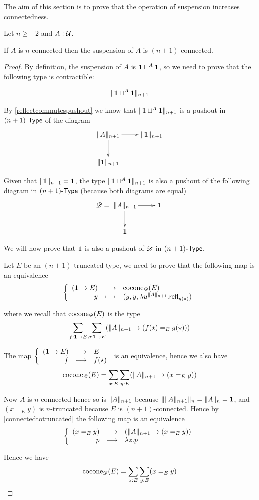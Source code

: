 The aim of this section is to prove that the operation of suspension increases
connectedness.

\begin{thm}
  Let $n\ge-2$ and $A:\type$.

  If $A$ is $n$-connected then the suspension of $A$ is $(n+1)$-connected.
\end{thm}

\begin{proof}
  By definition, the suspension of $A$ is $\unit\sqcup^A\unit$, so we need to
  prove that the following type is contractible:

  \[\trunc{n+1}{\unit\sqcup^A\unit}\]

  By \autoref{reflectcommutespushout} we know that
  $\trunc{n+1}{\unit\sqcup^A\unit}$ is a pushout in $\typelep{n+1}$ of the diagram
  \[\xymatrix{\trunc{n+1}A \ar[d] \ar[r] & \trunc{n+1}{\unit} \\
    \trunc{n+1}{\unit} & }\]

  Given that $\trunc{n+1}{\unit}=\unit$, the type
  $\trunc{n+1}{\unit\sqcup^A\unit}$ is also a pushout of the following diagram in
  $\typelep{n+1}$ (because both diagrams are equal)
  \[\Ddiag=\xymatrix{\trunc{n+1}A \ar[d] \ar[r] & \unit \\
    \unit & }\]

  We will now prove that $\unit$ is also a pushout of $\Ddiag$ in
  $\typelep{n+1}$.

  \bigskip

  Let $E$ be an $(n+1)$-truncated type, we need to prove that the following map
  is an equivalence
  \[\function{(\unit\to{}E)}{\cocone{\Ddiag}{E}}{y}
  {(y,y,\lambda{}u^{\trunc{n+1}A}.\refl{y(\ttt)})}\]

  where we recall that $\cocone{\Ddiag}{E}$ is the type
  \[\sum_{f:\unit\to{}E}\sum_{g:\unit\to{}E}(\trunc{n+1}A\to
  (f(\ttt)=_E{}g(\ttt)))\]

  The map $\function{(\unit\to{}E)}{E}{f}{f(\ttt)}$ is an equivalence, hence
  we also have
  \[\cocone{\Ddiag}{E}=\sum_{x:E}\sum_{y:E}(\trunc{n+1}A\to(x=_Ey))\]

  Now $A$ is $n$-connected hence so is $\trunc{n+1}A$ because
  $\trunc n{\trunc{n+1}A}=\trunc nA=\unit$, and $(x=_Ey)$ is $n$-truncated because
  $E$ is $(n+1)$-connected. Hence by \autoref{connectedtotruncated} the
  following map is an equivalence
  \[\function{(x=_Ey)}{(\trunc{n+1}A\to(x=_Ey))}{p}{\lambda{}z.p}\]

  Hence we have
  \[\cocone{\Ddiag}{E}=\sum_{x:E}\sum_{y:E}(x=_Ey)\]


\end{proof}
